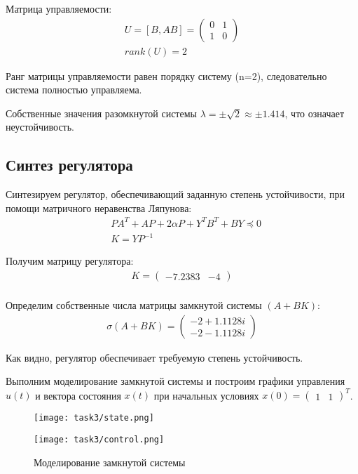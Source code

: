 Матрица управляемости:
\begin{align*}
U = [B, AB] = \begin{pmatrix} 0 & 1 \\ 1 & 0 \end{pmatrix} \\
rank(U) = 2
\end{align*}

Ранг матрицы управляемости равен порядку систему (n=2), следовательно система полностью управляема.

Собственные значения разомкнутой системы $\lambda = \pm\sqrt{2} \approx \pm 1.414$, что означает неустойчивость.

\subsection*{Синтез регулятора}

Синтезируем регулятор, обеспечивающий заданную степень устойчивости, 
при помощи матричного неравенства Ляпунова:
\begin{align}
& PA^T + AP + 2\alpha P + Y^T B^T + BY \preceq 0 \\
& K = YP^{-1}
\end{align}

Получим матрицу регулятора:
\begin{align*}
K = \begin{pmatrix} -7.2383 & -4 \end{pmatrix} \\
\end{align*}

Определим собственные числа матрицы замкнутой системы $(A+BK)$:
\begin{align*}
\sigma(A+BK) = \begin{pmatrix}-2 + 1.1128i \\ -2 - 1.1128i \end{pmatrix}
\end{align*}

Как видно, регулятор обеспечивает требуемую степень устойчивость.

Выполним моделирование замкнутой системы и построим
графики управления $u(t)$ и вектора состояния $x(t)$ 
при начальных условиях $x(0) = \begin{pmatrix} 1 & 1 \end{pmatrix}^T$.

\begin{figure}[H]
\centering
\begin{minipage}{0.7\linewidth}
\texttt{[image: task3/state.png]}
\end{minipage}
\begin{minipage}{0.7\linewidth}
\texttt{[image: task3/control.png]}
\end{minipage}
\caption{Моделирование замкнутой системы}
\label{fig:lmi_simulation}
\end{figure}

